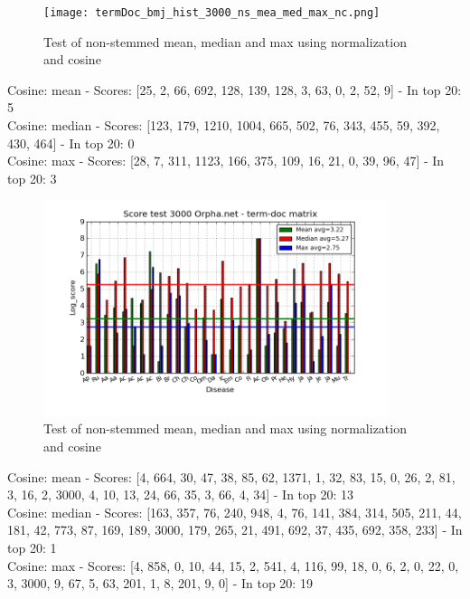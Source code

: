 \begin{figure}[h!]
        \begin{center}
          \texttt{[image: termDoc\_bmj\_hist\_3000\_ns\_mea\_med\_max\_nc.png]}
        \end{center}
        \caption{Test of non-stemmed mean, median and max using normalization and cosine}
        \label{termDoc_bmj_hist_3000_ns_mea_med_max_nc}
\end{figure}

 
Cosine: mean - Scores: [25, 2, 66, 692, 128, 139, 128, 3, 63, 0, 2, 52, 9] - In top 20: 5 \\
Cosine: median - Scores: [123, 179, 1210, 1004, 665, 502, 76, 343, 455, 59, 392, 430, 464] - In top 20: 0 \\
Cosine: max - Scores: [28, 7, 311, 1123, 166, 375, 109, 16, 21, 0, 39, 96, 47] - In top 20: 3 \\


\begin{figure}[h!]
        \begin{center}
          \includegraphics[width=0.9\textwidth]{barcharts/termDoc_orphan_hist_3000_ns_mea_med_max_nc.png}
        \end{center}
        \caption{Test of non-stemmed mean, median and max using normalization and cosine}
        \label{termDoc_orphan_hist_3000_ns_mea_med_max_nc}
\end{figure}
 
Cosine: mean - Scores: [4, 664, 30, 47, 38, 85, 62, 1371, 1, 32, 83, 15, 0, 26, 2, 81, 3, 16, 2, 3000, 4, 10, 13, 24, 66, 35, 3, 66, 4, 34] - In top 20: 13 \\
Cosine: median - Scores: [163, 357, 76, 240, 948, 4, 76, 141, 384, 314, 505, 211, 44, 181, 42, 773, 87, 169, 189, 3000, 179, 265, 21, 491, 692, 37, 435, 692, 358, 233] - In top 20: 1 \\
Cosine: max - Scores: [4, 858, 0, 10, 44, 15, 2, 541, 4, 116, 99, 18, 0, 6, 2, 0, 22, 0, 3, 3000, 9, 67, 5, 63, 201, 1, 8, 201, 9, 0] - In top 20: 19 \\

